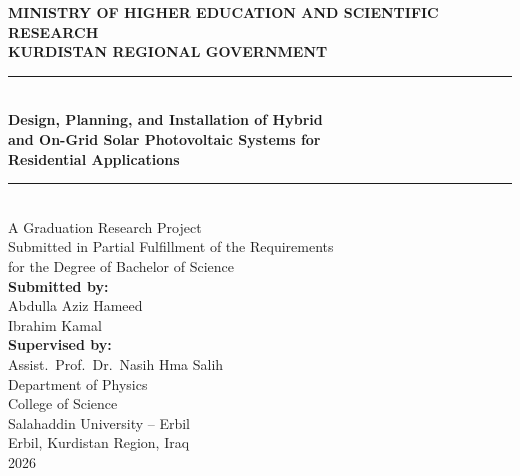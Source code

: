 \documentclass[12pt,a4paper]{report}
\begin{document}
\begin{titlepage}
    \centering
    \vspace*{1.5cm}

    {\large\textbf{MINISTRY OF HIGHER EDUCATION AND SCIENTIFIC RESEARCH}}\\[0.3cm]
    {\large\textbf{KURDISTAN REGIONAL GOVERNMENT}}\\[1.5cm]

    \rule{\textwidth}{1.5pt}\\[0.5cm]
    {\LARGE\bfseries Design, Planning, and Installation of Hybrid\\[0.3cm]
    and On-Grid Solar Photovoltaic Systems for\\[0.3cm]
    Residential Applications}\\[0.5cm]
    \rule{\textwidth}{1.5pt}\\[1.5cm]

    {\large A Graduation Research Project\\
    Submitted in Partial Fulfillment of the Requirements\\
    for the Degree of Bachelor of Science}\\[1.5cm]

    {\large\textbf{Submitted by:}}\\[0.3cm]
    {\large Abdulla Aziz Hameed}\\[0.15cm]
    {\large Ibrahim Kamal}\\[1cm]

    {\large\textbf{Supervised by:}}\\[0.3cm]
    {\large Assist.\ Prof.\ Dr.\ Nasih Hma Salih}\\[1.5cm]

    {\large Department of Physics\\
    College of Science\\
    Salahaddin University -- Erbil}\\[1cm]

    {\large Erbil, Kurdistan Region, Iraq\\
    2026}

    \vfill
\end{titlepage}


\tableofcontents
\newpage
\end{document}
